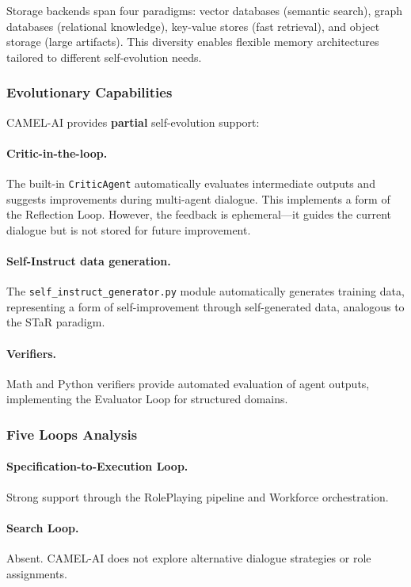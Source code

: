 Storage backends span four paradigms: vector databases (semantic search), graph databases (relational knowledge), key-value stores (fast retrieval), and object storage (large artifacts). This diversity enables flexible memory architectures tailored to different self-evolution needs.

\subsubsection{Evolutionary Capabilities}

CAMEL-AI provides \textbf{partial} self-evolution support:

\paragraph{Critic-in-the-loop.}
The built-in \texttt{CriticAgent} automatically evaluates intermediate outputs and suggests improvements during multi-agent dialogue. This implements a form of the Reflection Loop. However, the feedback is ephemeral---it guides the current dialogue but is not stored for future improvement.

\paragraph{Self-Instruct data generation.}
The \texttt{self\_instruct\_generator.py} module automatically generates training data, representing a form of self-improvement through self-generated data, analogous to the STaR paradigm.

\paragraph{Verifiers.}
Math and Python verifiers provide automated evaluation of agent outputs, implementing the Evaluator Loop for structured domains.

\subsubsection{Five Loops Analysis}

\paragraph{Specification-to-Execution Loop.}
Strong support through the RolePlaying pipeline and Workforce orchestration.

\paragraph{Search Loop.}
Absent. CAMEL-AI does not explore alternative dialogue strategies or role assignments.

